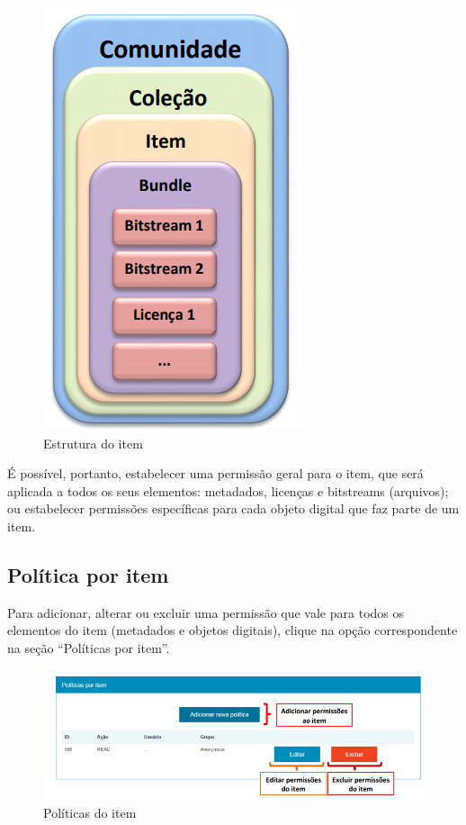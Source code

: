 \documentclass[12pt,hidelinks]{article}
\begin{document}
    \begin{figure}[!htp]
                \centering
                \includegraphics[scale=0.7]{figura/Figura111.png}
                \caption{Estrutura do item}
            \label{Rotulo}
        \end{figure}

\newpage
    
    É possível, portanto, estabelecer uma permissão geral para o item, que será aplicada a todos os seus elementos: metadados, licenças e bitstreams (arquivos); ou estabelecer permissões específicas para cada objeto digital que faz parte de um item. 
    
    \subsection{Política por item}
    
    Para adicionar, alterar ou excluir uma permissão que vale para todos os elementos do item (metadados e objetos digitais), clique na opção correspondente na seção “Políticas por item”.
    
    \begin{figure}[!htp]
                \centering
                \includegraphics[scale=0.8]{figura/Figura112.png}
                \caption{Políticas do item}
            \label{Rotulo}
        \end{figure}
    
\end{document}
